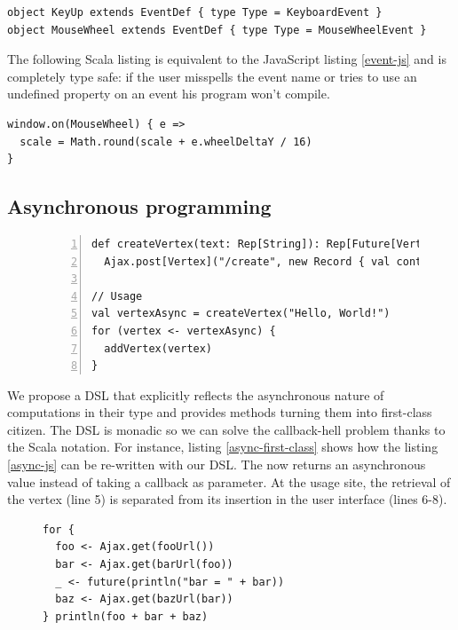 \documentclass[american,english,runningheads]{llncs}
\begin{document}
\begin{lstlisting}
object KeyUp extends EventDef { type Type = KeyboardEvent }
object MouseWheel extends EventDef { type Type = MouseWheelEvent }
\end{lstlisting}

The following Scala listing is equivalent to the JavaScript listing \ref{event-js} and is completely type safe: if the user misspells the event name or tries to use an undefined property on an event his program won’t compile.

\begin{lstlisting}
window.on(MouseWheel) { e =>
  scale = Math.round(scale + e.wheelDeltaY / 16)
}
\end{lstlisting}

\subsection{Asynchronous programming}

\begin{figure}
\centering
\begin{lstlisting}[numbers=left,caption=Asynchronous values are first class citizen,label=async-first-class]
def createVertex(text: Rep[String]): Rep[Future[Vertex]] =
  Ajax.post[Vertex]("/create", new Record { val content = text })

// Usage
val vertexAsync = createVertex("Hello, World!")
for (vertex <- vertexAsync) {
  addVertex(vertex)
}
\end{lstlisting}
\end{figure}

We propose a DSL that explicitly reflects the asynchronous nature of computations in their type and provides methods turning them into first-class citizen. The DSL is monadic so we can solve the callback-hell problem thanks to the Scala  notation. For instance, listing \ref{async-first-class} shows how the listing \ref{async-js} can be re-written with our DSL. The  now returns an asynchronous value instead of taking a callback as parameter. At the usage site, the retrieval of the vertex (line 5) is separated from its insertion in the user interface (lines 6-8).

\begin{figure}
\centering
\begin{lstlisting}[caption=No callback hell,label=async-no-callback]
for {
  foo <- Ajax.get(fooUrl())
  bar <- Ajax.get(barUrl(foo))
  _ <- future(println("bar = " + bar))
  baz <- Ajax.get(bazUrl(bar))
} println(foo + bar + baz)
\end{lstlisting}
\end{figure}
\end{document}
